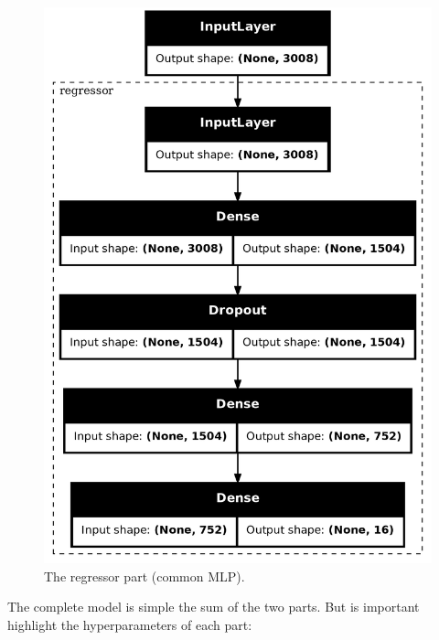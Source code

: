 \documentclass[sigconf,natbib=false]{acmart}
\begin{document}
\begin{figure}[h]
 \centering
 \includegraphics[width=0.8\linewidth]{figs/regressao.png}
 \caption{The regressor part (common MLP).}
\end{figure}

The complete model is simple the sum of the two parts. But is important highlight the hyperparameters of each part:
\end{document}
